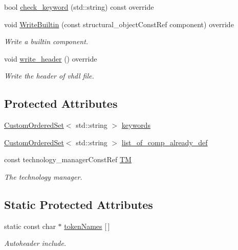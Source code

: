 \begin{DoxyCompactItemize}
bool \hyperlink{structVHDL__writer_a5c9eb93fec5f11553f37873b107dd739}{check\+\_\+keyword} (std\+::string) const override
\item 
void \hyperlink{structVHDL__writer_a1058749b23119ee23449b16921619e04}{Write\+Builtin} (const structural\+\_\+object\+Const\+Ref component) override
\begin{DoxyCompactList}\small\item\em Write a builtin component. \end{DoxyCompactList}\item 
void \hyperlink{structVHDL__writer_aae8bd96734b2cf29299f86ec53cfde3c}{write\+\_\+header} () override
\begin{DoxyCompactList}\small\item\em Write the header of vhdl file. \end{DoxyCompactList}\end{DoxyCompactItemize}
\subsection*{Protected Attributes}
\begin{DoxyCompactItemize}
\item 
\hyperlink{classCustomOrderedSet}{Custom\+Ordered\+Set}$<$ std\+::string $>$ \hyperlink{structVHDL__writer_a68438bcbd4f0b484090a4a9b10d487ee}{keywords}
\item 
\hyperlink{classCustomOrderedSet}{Custom\+Ordered\+Set}$<$ std\+::string $>$ \hyperlink{structVHDL__writer_a54d25538b5aca382ab62f7a5da4743c1}{list\+\_\+of\+\_\+comp\+\_\+already\+\_\+def}
\item 
const technology\+\_\+manager\+Const\+Ref \hyperlink{structVHDL__writer_a1229d2102ce3fd2c45b9848483e0bd0f}{TM}
\begin{DoxyCompactList}\small\item\em The technology manager. \end{DoxyCompactList}\end{DoxyCompactItemize}
\subsection*{Static Protected Attributes}
\begin{DoxyCompactItemize}
\item 
static const char $\ast$ \hyperlink{structVHDL__writer_a13015c583b732347cdf490034ae02ad3}{token\+Names} \mbox{[}$\,$\mbox{]}
\begin{DoxyCompactList}\small\item\em Autoheader include. \end{DoxyCompactList}\end{DoxyCompactItemize}
